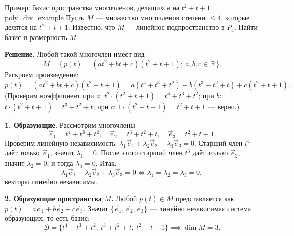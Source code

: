 \documentclass[12pt,a4paper]{article}
\begin{document}
\begin{definition}{Пример: базис пространства многочленов,
  делящихся на $t^2+t+1$}{poly_div_example}
  Пусть $M$ --- множество многочленов степени $\le 4$, которые делятся
  на $t^2 + t + 1$. Известно, что $M$ --- линейное подпространство в
  $P_4$. Найти базис и размерность $M$.

  \textbf{Решение.} Любой такой многочлен имеет вид
  \[
    M = \{\, p(t) = (at^2 + bt + c)(t^2 + t + 1); \ a, b, c \in
    \mathbb{R} \,\}.
  \]
  Раскроем произведение:
  \[
    p(t) = (at^2 + bt + c)(t^2 + t + 1) = a(t^4 + t^3 + t^2) + b(t^3 +
    t^2 + t) + c(t^2 + t + 1).
  \]
  (Проверим коэффициент при $a$: $t^2\cdot(t^2+t+1) = t^4 + t^3 +
    t^2$; при $b$: $t\cdot(t^2+t+1) = t^3 + t^2 + t$; при $c$:
  $1\cdot(t^2+t+1) = t^2 + t + 1$ --- верно.)

  \textbf{1. Образующие.} Рассмотрим многочлены
  \[
    \vec{e}_1 = t^4 + t^3 + t^2, \quad \vec{e}_2 = t^3 + t^2 + t,
    \quad \vec{e}_3 = t^2 + t + 1.
  \]
  Проверим линейную независимость: $\lambda_1\vec{e}_1 +
  \lambda_2\vec{e}_2 + \lambda_3\vec{e}_3 = 0$. Старший член $t^4$
  даёт только $\vec{e}_1$, значит $\lambda_1 = 0$. После этого старший
  член $t^3$ даёт только $\vec{e}_2$, значит $\lambda_2 = 0$, и тогда
  $\lambda_3 = 0$. Итак,
  \[
    \lambda_1\vec{e}_1 + \lambda_2\vec{e}_2 + \lambda_3\vec{e}_3 = 0
    \iff \lambda_1 = \lambda_2 = \lambda_3 = 0,
  \]
  векторы линейно независимы.

  \textbf{2. Образующие пространства $M$.} Любой $p(t) \in M$
  представляется как $p(t) = a\vec{e}_1 + b\vec{e}_2 + c\vec{e}_3$.
  Значит $\{\vec{e}_1, \vec{e}_2, \vec{e}_3\}$ --- линейно независимая
  система образующих, то есть базис:
  \[
    \mathcal{B} = \{t^4 + t^3 + t^2,\ t^3 + t^2 + t,\ t^2 + t + 1\}
    \implies \dim M = 3.
  \]
\end{definition}
\end{document}
